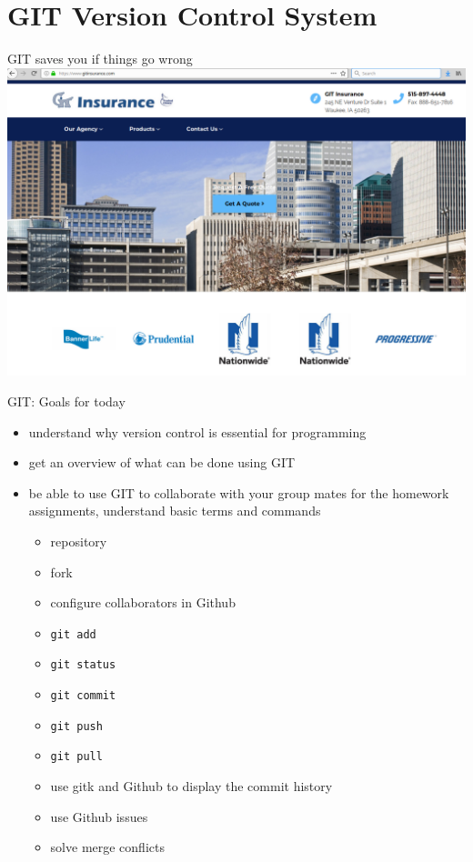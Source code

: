 \section{GIT Version Control System}

\begin{frame}[fragile]{GIT saves you if things go wrong}
    \includegraphics[width=\textwidth]{images/git-insurance.png}
\end{frame}


\begin{frame}[fragile]{GIT: Goals for today}
    \begin{itemize}
        \item understand why version control is essential for programming\pause
        \item get an overview of what can be done using GIT\pause
        \item be able to use GIT to collaborate with your group mates for the homework
            assignments, understand basic terms and commands\pause
        \begin{itemize}
            \item repository
            \item fork
            \item configure collaborators in Github
            \item \verb|git add|
            \item \verb|git status|
            \item \verb|git commit|
            \item \verb|git push|
            \item \verb|git pull|
            \item use gitk and Github to display the commit history
            \item use Github issues
            \item solve merge conflicts
        \end{itemize}
    \end{itemize}
\end{frame}


